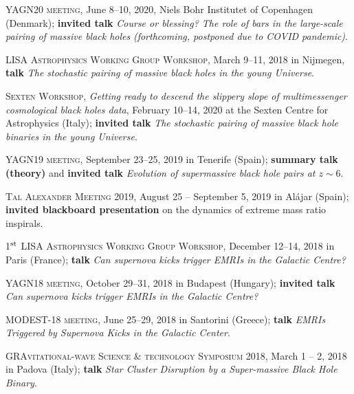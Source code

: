 \begin{etaremune}

    \item \textsc{YAGN20 meeting}, June 8--10, 2020, Niels Bohr Institutet of Copenhagen (Denmark);  {\bf invited talk}  \textit{Course or blessing? The role of bars in the large-scale pairing of massive black holes}
    \textit{(forthcoming, postponed due to COVID pandemic)}.
    
        \item \textsc{LISA Astrophysics Working Group Workshop}, March 9--11, 2018 in  Nijmegen,  {\bf talk} {\it The stochastic pairing of massive black holes in the young Universe}.
    
    \item \textsc{Sexten Workshop}, \textit{Getting ready to descend the slippery slope of multimessenger cosmological black holes data}, February 10--14, 2020 at the Sexten Centre for Astrophysics (Italy);  {\bf invited talk} \textit{The stochastic pairing of massive black hole binaries in the young Universe}.

    \item \textsc{YAGN19 meeting}, September 23--25, 2019 in  Tenerife (Spain); \textbf{summary talk (theory)} and {\bf invited talk}  {\it Evolution of supermassive black hole pairs at $z\sim 6$}.

    \item \textsc{Tal Alexander Meeting 2019,}%
     August 25 -- September 5, 2019 in Al\'ajar (Spain); {\bf invited blackboard presentation} on the dynamics of extreme mass ratio inspirals.

    \item \textsc{1$^{\rm st}$ LISA Astrophysics Working Group Workshop}, December 12--14, 2018 in  Paris (France); 
 {\bf talk} {\it Can supernova kicks trigger EMRIs in the Galactic Centre?}

    \item \textsc{YAGN18 meeting}, October 29--31, 2018 in  Budapest (Hungary); {\bf invited talk} {\it Can supernova kicks trigger EMRIs in the Galactic Centre?}

    \item \textsc{MODEST-18 meeting}, June 25--29, 2018 in Santorini (Greece); {\bf talk} {\it  EMRIs Triggered by Supernova Kicks in the Galactic Center}.

    \item \textsc{GRAvitational-wave Science \& technology Symposium 2018,} March 1 -- 2, 2018  in Padova (Italy);  {\bf talk} {\it Star Cluster Disruption by a Super-massive Black Hole Binary}.



\end{etaremune}
